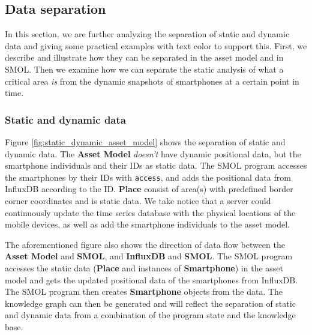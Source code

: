 \documentclass{article}
\begin{document}
\subsection{Data separation}
In this section, we are further analyzing the separation of static and dynamic data and giving some practical examples with text color to support this. First, we describe and illustrate how they can be separated in the asset model and in SMOL. Then we examine how we can separate the static analysis of what a critical area \emph{is} from the dynamic snapshots of smartphones at a certain point in time.

\subsubsection{Static and dynamic data}\label{subsubsec:StaticAndDynamicData}
Figure \ref{fig:static_dynamic_asset_model} shows the separation of static and dynamic data. The \textbf{Asset Model} \emph{doesn't} have dynamic positional data, but the smartphone individuals and their IDs as static data. The SMOL program accesses the smartphones by their IDs with \verb|access|, and adds the positional data from InfluxDB according to the ID. \textbf{Place} consist of area(s) with predefined border corner coordinates and is static data. We take notice that a server could continuously update the time series database with the physical locations of the mobile devices, as well as add the smartphone individuals to the asset model.

The aforementioned figure also shows the direction of data flow between the \textbf{Asset Model} and \textbf{SMOL}, and \textbf{InfluxDB} and \textbf{SMOL}. The SMOL program accesses the static data (\textbf{Place} and instances of \textbf{Smartphone}) in the asset model and gets the updated positional data of the smartphones from InfluxDB. The SMOL program then creates \textbf{Smartphone} objects from the data. The knowledge graph can then be generated and will reflect the separation of static and dynamic data from a combination of the program state and the knowledge base.
\end{document}
